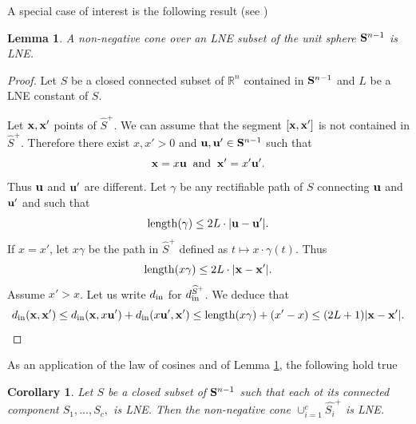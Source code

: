 \documentclass[11pt]{amsart}
\newtheorem{lemma}[theorem]{Lemma}
\newtheorem{corollary}[theorem]{Corollary}
\newcommand{\field}[1]{\mathbb{#1}}
\newcommand{\R}{\field{R}}
\newcommand{\wh}[1]{\widehat{#1}}
\newcommand{\bS}{{\bf S}}
\newcommand{\bu}{{\bf u}}
\newcommand{\bx}{{\bf x}}
\newcommand{\by}{{\bf y}}
\newcommand{\dist}{{\rm dist}}
\newcommand{\dlt}{{\delta}}
\newcommand{\gm}{{\gamma}}
\newcommand{\inn}{{{\rm in}}}
\newcommand{\lgth}{{\rm length}}
\newcommand{\Rn}{{\R^n}}
\numberwithin{equation}{section}
\numberwithin{equation}{section}
\begin{document}
A special case of interest is the following result (see \cite[Proposition 
2.8]{KePeRu})
%
%
\begin{lemma}\label{lem:cone-LNE}
	A non-negative cone over an LNE subset of the unit sphere  $\bS^{n-1}$ is LNE. 	
	
\end{lemma}
%
%
\begin{proof}
	Let  $S$ be a closed connected subset of $\Rn$ contained in $\bS^{n-1}$ and $L$ be a LNE constant of $S$.
	
	Let $\bx,\bx'$ points of $\wh{S}^+$. We can assume that the segment 
	$[\bx,\bx']$ is not contained in $\wh{S}^+$. Therefore there exist
	$x,x'>0$ and $\bu,\bu' \in \bS^{n-1}$ such that
	$$
	\bx = x \bu \;\; {\rm and} \;\;  \bx' = x' \bu'.
	$$
	Thus $\bu$ and $\bu'$ are different. Let $\gm$ be any 
	rectifiable path of $S$ connecting $\bu$ and $\bu'$ and such that
	$$
	\lgth(\gm) \leq 2L\cdot |\bu-\bu'|.
	$$
	If $x =x'$, let $x\gm$ be the path in $\wh{S}^+$ defined as 
	$t \mapsto x\cdot \gm(t)$. Thus 
	$$
	\lgth(x\gm) \leq 2 L \cdot |\bx - \bx'|.
	$$
	Assume $x' > x$. 
	Let us write $d_\inn$ for $d_\inn^{\wh{S}^+}$. We deduce that
	$$
	d_\inn (\bx,\bx') \leq d_\inn(\bx,x\bu') + d_\inn (x\bu',\bx') \leq
	\lgth(x\gm) + (x'-x) \leq (2L + 1) |\bx - \bx'|.
	$$
\end{proof}
%
%
%
%
As an application of the law of cosines and of Lemma \ref{lem:cone-LNE}, the following 
hold true 
%
%
\begin{corollary}\label{cor:union-cone-LNE}
	Let $S$ be a closed subset of $\bS^{n-1}$ such that each ot its 
	connected component  $S_1, \ldots,S_c,$ is LNE. 
    Then the non-negative cone $\cup_{i=1}^c \wh{S_i}^+$ is LNE.
\end{corollary}
%
%
\end{document}
